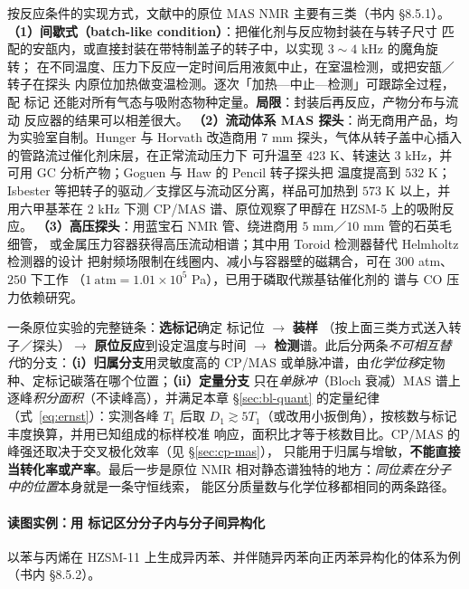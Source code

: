 \begin{measure}
按反应条件的实现方式，文献中的原位 MAS NMR 主要有三类（书内 §8.5.1）。
\textbf{（1）间歇式（batch-like condition）}：把催化剂与反应物封装在与转子尺寸
匹配的安瓿内，或直接封装在带特制盖子的转子中，以实现 $3\sim4$ kHz 的魔角旋转；
在不同温度、压力下反应一定时间后用液氮中止，在室温检测，或把安瓿／转子在探头
内原位加热做变温检测。逐次「加热—中止—检测」可跟踪全过程，配  标记
还能对所有气态与吸附态物种定量。\textbf{局限}：封装后再反应，产物分布与流动
反应器的结果可以相差很大。
\textbf{（2）流动体系 MAS 探头}：尚无商用产品，均为实验室自制。Hunger 与 Horvath
改造商用 $7$ mm 探头，气体从转子盖中心插入的管路流过催化剂床层，在正常流动压力下
可升温至 $423$ K、转速达 $3$ kHz，并可用 GC 分析产物；Goguen 与 Haw 的 Pencil 转子探头把
温度提高到 $532$ K；Isbester 等把转子的驱动／支撑区与流动区分离，样品可加热到
$573$ K 以上，并用六甲基苯在 $2$ kHz 下测 CP/MAS 谱、原位观察了甲醇在 HZSM-5
上的吸附反应。
\textbf{（3）高压探头}：用蓝宝石 NMR 管、绕进商用 $5$ mm／$10$ mm 管的石英毛细管，
或金属压力容器获得高压流动相谱；其中用 Toroid 检测器替代 Helmholtz 检测器的设计
把射频场限制在线圈内、减小与容器壁的磁耦合，可在 $300$ atm、$250$ \degC{} 下工作
（$1\ \mathrm{atm}=1.01\times10^{5}$ Pa），已用于磷取代羰基钴催化剂的 
谱与 CO 压力依赖研究。
\end{measure}

\begin{dataflow}
一条原位实验的完整链条：\textbf{选标记}确定  标记位 $\to$ \textbf{装样}
（按上面三类方式送入转子／探头）$\to$ \textbf{原位反应}到设定温度与时间 $\to$
\textbf{检测}谱。此后分两条\emph{不可相互替代}的分支：\textbf{（i）归属分支}用灵敏度高的
CP/MAS 或单脉冲谱，由\emph{化学位移}定物种、定标记碳落在哪个位置；\textbf{（ii）定量分支}
只在\emph{单脉冲}（Bloch 衰减）MAS 谱上逐峰\emph{积分面积}（不读峰高），并满足本章
\S\ref{sec:bl-quant} 的定量纪律（式~\eqref{eq:ernst}）：实测各峰 $T_1$ 后取
$D_1\gtrsim5T_1$（或改用小扳倒角），按核数与标记丰度换算，并用已知组成的标样校准
响应，面积比才等于核数目比。CP/MAS 的峰强还取决于交叉极化效率（见 \S\ref{sec:cp-mas}），
只能用于归属与增敏，\textbf{不能直接当转化率或产率}。最后一步是原位
NMR 相对静态谱独特的地方：\emph{同位素在分子中的位置}本身就是一条守恒线索，
能区分质量数与化学位移都相同的两条路径。
\end{dataflow}

\paragraph{读图实例：用  标记区分分子内与分子间异构化}
以苯与丙烯在 HZSM-11 上生成异丙苯、并伴随异丙苯向正丙苯异构化的体系为例
（书内 §8.5.2）。

